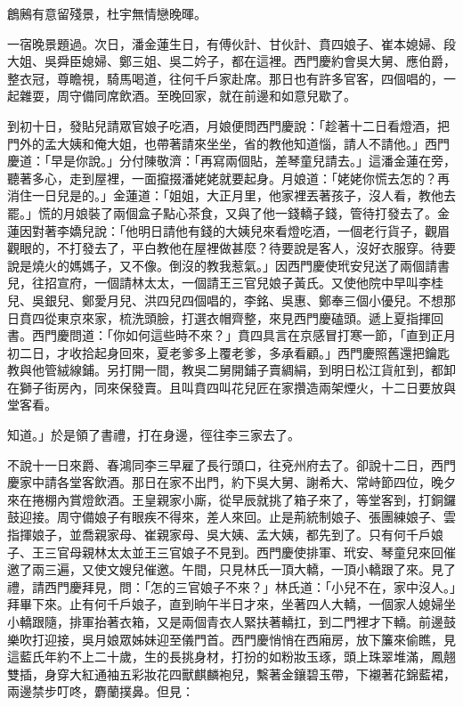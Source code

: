 鶬鶊有意留殘景，杜宇無情戀晚暉。

一宿晚景題過。次日，潘金蓮生日，有傅伙計、甘伙計、賁四娘子、崔本媳婦、段大姐、吳舜臣媳婦、鄭三姐、吳二妗子，都在這裡。西門慶約會吳大舅、應伯爵，整衣冠，尊瞻視，騎馬喝道，往何千戶家赴席。那日也有許多官客，四個唱的，一起雜耍，周守備同席飲酒。至晚回家，就在前邊和如意兒歇了。

到初十日，發貼兒請眾官娘子吃酒，月娘便問西門慶說：「趁著十二日看燈酒，把門外的孟大姨和俺大姐，也帶著請來坐坐，省的教他知道惱，請人不請他。」西門慶道：「早是你說。」分付陳敬濟：「再寫兩個貼，差琴童兒請去。」這潘金蓮在旁，聽著多心，走到屋裡，一面攛掇潘姥姥就要起身。月娘道：「姥姥你慌去怎的？再消住一日兒是的。」金蓮道：「姐姐，大正月里，他家裡丟著孩子，沒人看，教他去罷。」慌的月娘裝了兩個盒子點心茶食，又與了他一錢轎子錢，管待打發去了。金蓮因對著李嬌兒說：「他明日請他有錢的大姨兒來看燈吃酒，一個老行貨子，觀眉觀眼的，不打發去了，平白教他在屋裡做甚麼？待要說是客人，沒好衣服穿。待要說是燒火的媽媽子，又不像。倒沒的教我惹氣。」因西門慶使玳安兒送了兩個請書兒，往招宣府，一個請林太太，一個請王三官兒娘子黃氏。又使他院中早叫李桂兒、吳銀兒、鄭愛月兒、洪四兒四個唱的，李銘、吳惠、鄭奉三個小優兒。不想那日賁四從東京來家，梳洗頭臉，打選衣帽齊整，來見西門慶磕頭。遞上夏指揮回書。西門慶問道：「你如何這些時不來？」賁四具言在京感冒打寒一節，「直到正月初二日，才收拾起身回來，夏老爹多上覆老爹，多承看顧。」西門慶照舊還把鑰匙教與他管絨線鋪。另打開一間，教吳二舅開鋪子賣綢絹，到明日松江貨舡到，都卸在獅子街房內，同來保發賣。且叫賁四叫花兒匠在家攢造兩架煙火，十二日要放與堂客看。

知道。」於是領了書禮，打在身邊，徑往李三家去了。

不說十一日來爵、春鴻同李三早雇了長行頭口，往兗州府去了。卻說十二日，西門慶家中請各堂客飲酒。那日在家不出門，約下吳大舅、謝希大、常峙節四位，晚夕來在捲棚內賞燈飲酒。王皇親家小廝，從早辰就挑了箱子來了，等堂客到，打銅鑼鼓迎接。周守備娘子有眼疾不得來，差人來回。止是荊統制娘子、張團練娘子、雲指揮娘子，並喬親家母、崔親家母、吳大姨、孟大姨，都先到了。只有何千戶娘子、王三官母親林太太並王三官娘子不見到。西門慶使排軍、玳安、琴童兒來回催邀了兩三遍，又使文嫂兒催邀。午間，只見林氏一頂大轎，一頂小轎跟了來。見了禮，請西門慶拜見，問：「怎的三官娘子不來？」林氏道：「小兒不在，家中沒人。」拜畢下來。止有何千戶娘子，直到晌午半日才來，坐著四人大轎，一個家人媳婦坐小轎跟隨，排軍抬著衣箱，又是兩個青衣人緊扶著轎扛，到二門裡才下轎。前邊鼓樂吹打迎接，吳月娘眾姊妹迎至儀門首。西門慶悄悄在西廂房，放下簾來偷瞧，見這藍氏年約不上二十歲，生的長挑身材，打扮的如粉妝玉琢，頭上珠翠堆滿，鳳翹雙插，身穿大紅通袖五彩妝花四獸麒麟袍兒，繫著金鑲碧玉帶，下襯著花錦藍裙，兩邊禁步叮咚，麝蘭撲鼻。但見：

